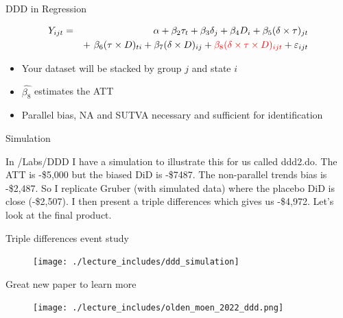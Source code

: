\documentclass{beamer}
\begin{document}
\begin{frame}{DDD in Regression}
	
	\begin{eqnarray*}
	Y_{ijt} &=&\alpha +  \beta_2 \tau_t + \beta_3 \delta_j  + \beta_4 D_i + \beta_5(\delta \times \tau)_{jt} \\
	&& +\ \beta_6(\tau \times D)_{ti} +  \beta_7(\delta \times D)_{ij} +  \textcolor{red}{\beta_8(\delta \times \tau \times  D)_{ijt}}+  \varepsilon_{ijt}
	\end{eqnarray*}
	
	\begin{itemize}
	\item Your dataset will be stacked by group $j$ and state $i$
	\item $\widehat{\beta_8}$ estimates the ATT
	\item Parallel bias, NA and SUTVA necessary and sufficient for identification
	\end{itemize}
	
\end{frame}



\begin{frame}{Simulation}

In /Labs/DDD I have a simulation to illustrate this for us called ddd2.do.  The ATT is -\$5,000 but the biased DiD is -\$7487.  The non-parallel trends bias is -\$2,487.  So I replicate Gruber (with simulated data) where the placebo DiD is close (-\$2,507).  I then present a triple differences which gives us -\$4,972. Let's look at the final product.

\end{frame}

\begin{frame}{Triple differences event study}

\begin{figure}
\texttt{[image: ./lecture\_includes/ddd\_simulation]}
\end{figure}



\end{frame}  

\begin{frame}{Great new paper to learn more}

\begin{figure}
\texttt{[image: ./lecture\_includes/olden\_moen\_2022\_ddd.png]}
\end{figure}

\end{frame}
\end{document}
